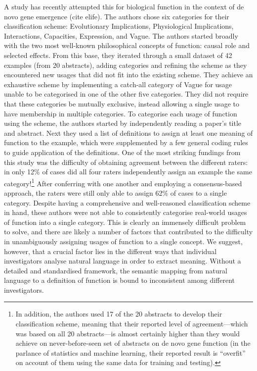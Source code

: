 \documentclass{article}
\begin{document}
A study has recently attempted this for biological function in the context of de novo gene emergence (cite elife).
The authors chose six categories for their classification scheme: Evolutionary Implications, Physiological Implications, Interactions, Capacities, Expression, and Vague.
The authors started broadly with the two most well-known philosophical concepts of function: causal role and selected effects.
From this base, they iterated through a small dataset of 42 examples (from 20 abstracts), adding categories and refining the scheme as they encountered new usages that did not fit into the existing scheme.
They achieve an exhaustive scheme by implementing a catch-all category of Vague for usage unable to be categorised in one of the other five categories.
They did not require that these categories be mutually exclusive, instead allowing a single usage to have membership in multiple categories.
To categorise each usage of function using the scheme, the authors started by independently reading a paper's title and abstract.
Next they used a list of definitions to assign at least one meaning of function to the example, which were supplemented by a few general coding rules to guide application of the definitions.
One of the most striking fundings from this study was the difficulty of obtaining agreement between the different raters: in only 12\% of cases did all four raters independently assign an example the same category!\footnote{In addition, the authors used 17 of the 20 abstracts to develop their classification scheme, meaning that their reported level of agreement---which was based on all 20 abstracts---is almost certainly higher than they would achieve on never-before-seen set of abstracts on de novo gene function (in the parlance of statistics and machine learning, their reported result is ``overfit'' on account of them using the same data for training and testing).}
After conferring with one another and employing a consensus-based approach, the raters were still only able to assign 62\% of cases to a single category.
Despite having a comprehensive and well-reasoned classification scheme in hand, these authors were not able to consistently categorise real-world usages of function into a single category.
This is clearly an immensely difficult problem to solve, and there are likely a number of factors that contributed to the difficulty in unambiguously assigning usages of function to a single concept.
We suggest, however, that a crucial factor lies in the different ways that individual investigators analyse natural language in order to extract meaning.
Without a detailed and standardised framework, the semantic mapping from natural language to a definition of function is bound to inconsistent among different investigators.
\end{document}
